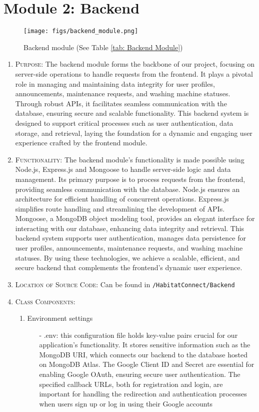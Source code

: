 \documentclass[conference]{IEEEtran}
\begin{document}
\section*{Module 2: Backend}
\begin{figure}[H]
\centering
\texttt{[image: figs/backend\_module.png]}
\caption{Backend module (See Table \ref{tab: Backend Module})}
\label{fig:Backend module}
\end{figure}
\begin{enumerate}
    \item \textsc{Purpose:} The backend module forms the backbone of our project, focusing on server-side operations to handle requests from the frontend. It plays a pivotal role in managing and maintaining data integrity for user profiles, announcements, maintenance requests, and washing machine statuses. Through robust APIs, it facilitates seamless communication with the database, ensuring secure and scalable functionality. This backend system is designed to support critical processes such as user authentication, data storage, and retrieval, laying the foundation for a dynamic and engaging user experience crafted by the frontend module.
    \item \textsc{Functionality:} The backend module’s functionality is made possible using Node.js, Express.js and Mongoose to handle server-side logic and data management. Its primary purpose is to process requests from the frontend, providing seamless communication with the database. Node.js ensures an architecture for efficient handling of concurrent operations. Express.js simplifies route handling and streamlining the development of APIs. Mongoose, a MongoDB object modeling tool, provides an elegant interface for interacting with our database, enhancing data integrity and retrieval. This backend system supports user authentication, manages data persistence for user profiles, announcements, maintenance requests, and washing machine statuses. By using these technologies, we achieve a scalable, efficient, and secure backend that complements the frontend's dynamic user experience.
    \item \textsc{Location of Source Code:} Can be found in \texttt{/HabitatConnect/Backend}
    \item \textsc{Class Components:}
        \begin{enumerate}
            \item Environment settings
                \begin{itemize}
                    \item[-] .env: this configuration file holds key-value pairs crucial for our application's functionality. It stores sensitive information such as the MongoDB URI, which connects our backend to the database hosted on MongoDB Atlas. The Google Client ID and Secret are essential for enabling Google OAuth, ensuring secure user authentication. The specified callback URLs, both for registration and login, are important for handling the redirection and authentication processes when users sign up or log in using their Google accounts

\end{itemize}
\end{enumerate}
\end{enumerate}
\end{document}
